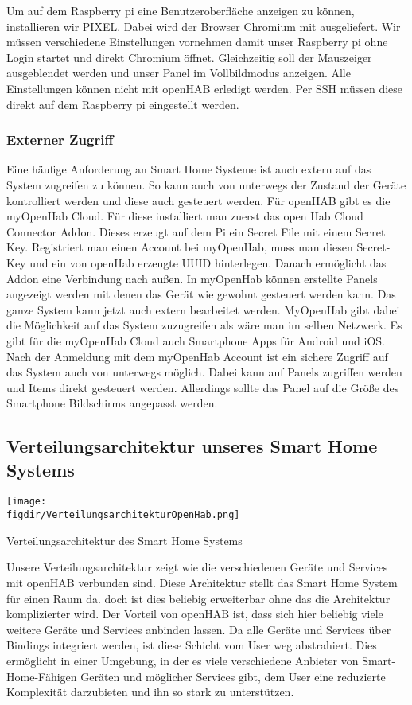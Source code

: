 		Um auf dem Raspberry pi eine Benutzeroberfläche anzeigen zu können, installieren wir PIXEL. Dabei wird der Browser Chromium mit ausgeliefert. Wir müssen verschiedene Einstellungen vornehmen damit unser Raspberry pi ohne Login startet und direkt Chromium öffnet. Gleichzeitig soll der Mauszeiger ausgeblendet werden und unser Panel im Vollbildmodus anzeigen. Alle Einstellungen können nicht mit openHAB erledigt werden. Per SSH müssen diese direkt auf dem Raspberry pi eingestellt werden.

		\subsubsection{Externer Zugriff}
		Eine häufige Anforderung an Smart Home Systeme ist auch extern auf das System zugreifen zu können. So kann auch von unterwegs der Zustand der Geräte kontrolliert werden und diese auch gesteuert werden. Für openHAB gibt es die myOpenHab Cloud. Für diese installiert man zuerst das open Hab Cloud Connector Addon. Dieses erzeugt auf dem Pi ein Secret File mit einem Secret Key. Registriert man einen Account bei myOpenHab, muss man diesen Secret-Key und ein von openHab erzeugte UUID hinterlegen. Danach ermöglicht das Addon eine Verbindung nach außen.
		In myOpenHab können erstellte Panels angezeigt werden mit denen das Gerät wie gewohnt gesteuert werden kann. Das ganze System kann jetzt auch extern bearbeitet werden. MyOpenHab gibt dabei die Möglichkeit auf das System zuzugreifen als wäre man im selben Netzwerk.
		Es gibt für die myOpenHab Cloud auch Smartphone Apps für Android und iOS. Nach der Anmeldung mit dem myOpenHab Account ist ein sichere Zugriff auf das System auch von unterwegs möglich. Dabei kann auf Panels zugriffen werden und Items direkt gesteuert werden. Allerdings sollte das Panel auf die Größe des Smartphone Bildschirms angepasst werden.
		
		
		\subsection{Verteilungsarchitektur unseres Smart Home Systems}
		
\begin{minipage}{\textwidth}
	\centering
	\captionsetup{type=figure}
	\texttt{[image: \\figdir/VerteilungsarchitekturOpenHab.png]}
	\caption{Verteilungsarchitektur des Smart Home Systems \label{fig:activity-diagram}}
\end{minipage}

	Unsere Verteilungsarchitektur zeigt wie die verschiedenen Geräte und Services mit openHAB verbunden sind. Diese Architektur stellt das Smart Home System für einen Raum da. doch ist dies beliebig erweiterbar ohne das die Architektur komplizierter wird. Der Vorteil von openHAB ist, dass sich hier beliebig viele weitere Geräte und Services anbinden lassen. Da alle Geräte und Services über Bindings integriert werden, ist diese Schicht vom User weg abstrahiert. Dies ermöglicht in einer Umgebung, in der es viele verschiedene Anbieter von Smart-Home-Fähigen Geräten und möglicher Services gibt, dem User eine reduzierte Komplexität darzubieten und ihn so stark zu unterstützen.
	
